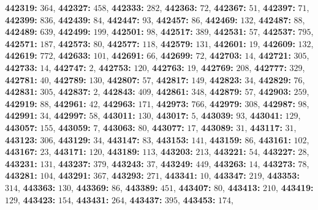 \textsf{\bfseries 442319:} $364$, \textsf{\bfseries 442327:} $458$, \textsf{\bfseries 442333:} $282$, \textsf{\bfseries 442363:} $72$, \textsf{\bfseries 442367:} $51$, \textsf{\bfseries 442397:} $71$, \textsf{\bfseries 442399:} $836$, \textsf{\bfseries 442439:} $84$, \textsf{\bfseries 442447:} $93$, \textsf{\bfseries 442457:} $86$, \textsf{\bfseries 442469:} $132$, \textsf{\bfseries 442487:} $88$, \textsf{\bfseries 442489:} $639$, \textsf{\bfseries 442499:} $199$, \textsf{\bfseries 442501:} $98$, \textsf{\bfseries 442517:} $389$, \textsf{\bfseries 442531:} $57$, \textsf{\bfseries 442537:} $795$, \textsf{\bfseries 442571:} $187$, \textsf{\bfseries 442573:} $80$, \textsf{\bfseries 442577:} $118$, \textsf{\bfseries 442579:} $131$, \textsf{\bfseries 442601:} $19$, \textsf{\bfseries 442609:} $132$, \textsf{\bfseries 442619:} $772$, \textsf{\bfseries 442633:} $101$, \textsf{\bfseries 442691:} $66$, \textsf{\bfseries 442699:} $72$, \textsf{\bfseries 442703:} $14$, \textsf{\bfseries 442721:} $305$, \textsf{\bfseries 442733:} $14$, \textsf{\bfseries 442747:} $2$, \textsf{\bfseries 442753:} $120$, \textsf{\bfseries 442763:} $19$, \textsf{\bfseries 442769:} $208$, \textsf{\bfseries 442777:} $329$, \textsf{\bfseries 442781:} $40$, \textsf{\bfseries 442789:} $130$, \textsf{\bfseries 442807:} $57$, \textsf{\bfseries 442817:} $149$, \textsf{\bfseries 442823:} $34$, \textsf{\bfseries 442829:} $76$, \textsf{\bfseries 442831:} $305$, \textsf{\bfseries 442837:} $2$, \textsf{\bfseries 442843:} $409$, \textsf{\bfseries 442861:} $348$, \textsf{\bfseries 442879:} $57$, \textsf{\bfseries 442903:} $259$, \textsf{\bfseries 442919:} $88$, \textsf{\bfseries 442961:} $42$, \textsf{\bfseries 442963:} $171$, \textsf{\bfseries 442973:} $766$, \textsf{\bfseries 442979:} $308$, \textsf{\bfseries 442987:} $98$, \textsf{\bfseries 442991:} $34$, \textsf{\bfseries 442997:} $58$, \textsf{\bfseries 443011:} $130$, \textsf{\bfseries 443017:} $5$, \textsf{\bfseries 443039:} $93$, \textsf{\bfseries 443041:} $129$, \textsf{\bfseries 443057:} $155$, \textsf{\bfseries 443059:} $7$, \textsf{\bfseries 443063:} $80$, \textsf{\bfseries 443077:} $17$, \textsf{\bfseries 443089:} $31$, \textsf{\bfseries 443117:} $31$, \textsf{\bfseries 443123:} $306$, \textsf{\bfseries 443129:} $34$, \textsf{\bfseries 443147:} $83$, \textsf{\bfseries 443153:} $141$, \textsf{\bfseries 443159:} $86$, \textsf{\bfseries 443161:} $102$, \textsf{\bfseries 443167:} $23$, \textsf{\bfseries 443171:} $120$, \textsf{\bfseries 443189:} $113$, \textsf{\bfseries 443203:} $213$, \textsf{\bfseries 443221:} $54$, \textsf{\bfseries 443227:} $28$, \textsf{\bfseries 443231:} $131$, \textsf{\bfseries 443237:} $379$, \textsf{\bfseries 443243:} $37$, \textsf{\bfseries 443249:} $449$, \textsf{\bfseries 443263:} $14$, \textsf{\bfseries 443273:} $78$, \textsf{\bfseries 443281:} $104$, \textsf{\bfseries 443291:} $367$, \textsf{\bfseries 443293:} $271$, \textsf{\bfseries 443341:} $10$, \textsf{\bfseries 443347:} $219$, \textsf{\bfseries 443353:} $314$, \textsf{\bfseries 443363:} $130$, \textsf{\bfseries 443369:} $86$, \textsf{\bfseries 443389:} $451$, \textsf{\bfseries 443407:} $80$, \textsf{\bfseries 443413:} $210$, \textsf{\bfseries 443419:} $129$, \textsf{\bfseries 443423:} $154$, \textsf{\bfseries 443431:} $264$, \textsf{\bfseries 443437:} $395$, \textsf{\bfseries 443453:} $174$, 
